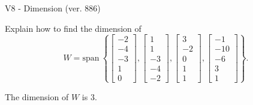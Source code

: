 \begin{exercise}
  \begin{exerciseTitle}V8 - Dimension (ver. 886)\end{exerciseTitle}
  \begin{exerciseStatement}
    Explain how to find the dimension of 
\[W=\mathrm{span}\ \left\{\left[\begin{array}{r}
-2 \\
-4 \\
-3 \\
1 \\
0
\end{array}\right] , \left[\begin{array}{r}
1 \\
1 \\
-3 \\
-4 \\
-2
\end{array}\right] , \left[\begin{array}{r}
3 \\
-2 \\
0 \\
1 \\
1
\end{array}\right] , \left[\begin{array}{r}
-1 \\
-10 \\
-6 \\
3 \\
1
\end{array}\right]\right\}.\]



  \end{exerciseStatement}
  \begin{exerciseAnswer}
   The dimension of \(W\) is  \(3\).
  


  \end{exerciseAnswer}
\end{exercise}